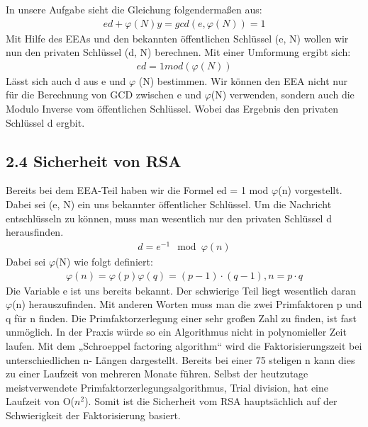 \documentclass[course=asp]{aspdoc}
\begin{document}
In unsere Aufgabe sieht die Gleichung folgendermaßen aus:
\begin{align}
	ed + \varphi (N)y = gcd(e, \varphi(N)) = 1
\end{align}
Mit Hilfe des EEAs und den bekannten öffentlichen Schlüssel (e, N) wollen wir nun den privaten Schlüssel (d, N) berechnen. Mit einer Umformung ergibt sich: 
\begin{align}	
	ed = 1 mod (\varphi(N))
\end{align}
Lässt sich auch d aus e und $\varphi $ (N) bestimmen. Wir können den EEA nicht nur für die Berechnung von GCD zwischen e und $\varphi $(N) verwenden, sondern auch die Modulo Inverse vom öffentlichen Schlüssel. Wobei das Ergebnis den privaten Schlüssel d ergbit.

\subsection*{2.4 Sicherheit von RSA}
Bereits bei dem EEA-Teil haben wir die Formel ed = 1 mod $\varphi $(n) vorgestellt.  Dabei sei (e, N) ein uns bekannter öffentlicher Schlüssel. Um die Nachricht entschlüsseln zu können, muss man wesentlich nur den privaten Schlüssel d herausfinden. 
\begin{align}
	d = e^{-1} \mod \varphi (n)
\end{align}
Dabei sei $\varphi $(N) wie folgt definiert:
\begin{align}
	\varphi (n) = \varphi (p)\varphi (q) = (p-1) \cdot (q-1), n = p \cdot q
\end{align}
Die Variable e ist uns bereits bekannt. Der schwierige Teil liegt wesentlich daran $\varphi $(n) herauszufinden. Mit anderen Worten muss man die zwei Primfaktoren p und q für n finden. Die Primfaktorzerlegung einer sehr großen Zahl zu finden, ist fast unmöglich. In der Praxis würde so ein Algorithmus nicht in polynomieller Zeit laufen. Mit dem „Schroeppel factoring algorithm“ wird die Faktorisierungszeit bei unterschiedlichen n- Längen dargestellt. Bereits bei einer 75 steligen n  kann dies zu einer Laufzeit von mehreren Monate führen. Selbst der heutzutage meistverwendete Primfaktorzerlegungsalgorithmus, Trial division, hat eine Laufzeit von O($n^{2}$). Somit ist die Sicherheit vom RSA hauptsächlich auf der Schwierigkeit der Faktorisierung basiert.
\end{document}
